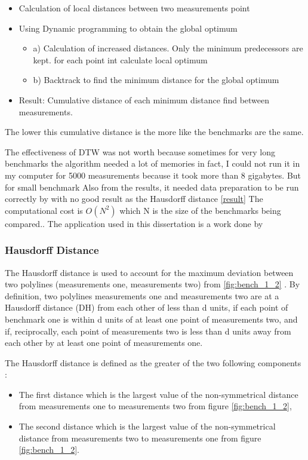 \documentclass{article}
\begin{document}
\begin{itemize}
    \item Calculation of local distances between two measurements point
    \item Using Dynamic programming to obtain the global optimum \begin{itemize}
        \item a) Calculation of increased distances. Only the minimum predecessors are kept. for each point int calculate local optimum
        \item b) Backtrack to find the minimum distance for the global optimum
    \end{itemize}
    \item Result: Cumulative distance of each minimum distance find between measurements.
\end{itemize}

The lower this cumulative distance is the more like the benchmarks are the same.

The effectiveness of DTW was not worth because sometimes for very long benchmarks the algorithm needed a lot of memories in fact, I could not run it in my computer for 5000 measurements because it took more than 8 gigabytes. But for small benchmark
Also from the results, it needed data preparation to be run correctly by with no good result as the Hausdorff distance \ref{result}
The computational cost is $O(N^2)$ which N is the size of the benchmarks being compared..
The application used in this dissertation is a work done by \citep{salvador2007toward}

\subsubsection{Hausdorff Distance }
The Hausdorff distance \citep{belogay1997calculating} is used to account for the maximum deviation between two polylines (measurements one, measurements two) from \ref{fig:bench_1_2} . By definition, two polylines measurements one and measurements two are at a Hausdorff distance (DH) from each other of less than d units, if each point of benchmark one is within d units of at least one point of measurements two, and if, reciprocally, each point of measurements two is less than d units away from each other by at least one point of measurements one.

The Hausdorff distance is defined as the greater of the two following components :

\begin{itemize}
    \item The first distance which is the largest value of the non-symmetrical distance from measurements one to measurements two from figure \ref{fig:bench_1_2},
    \item The second distance which is the largest value of the non-symmetrical distance from measurements two to measurements one from figure \ref{fig:bench_1_2}.
\end{itemize}
\end{document}
